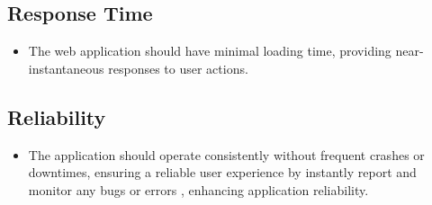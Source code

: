 \subsection{Response Time}
\begin{itemize}
	\item The web application should have minimal loading time, providing near-instantaneous responses to user actions.
\end{itemize}

\subsection{Reliability}
\begin{itemize}
	\item The application should operate consistently without frequent crashes or downtimes, ensuring a reliable user experience by instantly report and monitor any bugs or errors \citep{sentry-docs}, enhancing application reliability.
\end{itemize}






